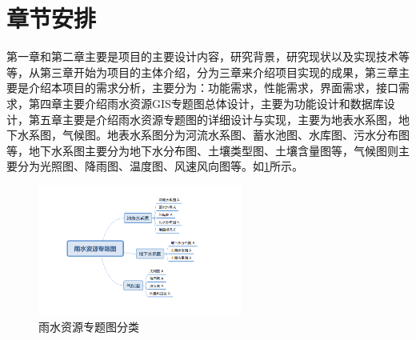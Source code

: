 \section{章节安排}
第一章和第二章主要是项目的主要设计内容，研究背景，研究现状以及实现技术等等，从第三章开始为项目的主体介绍，分为三章来介绍项目实现的成果，第三章主要是介绍本项目的需求分析，主要分为：功能需求，性能需求，界面需求，接口需求，第四章主要介绍雨水资源GIS专题图总体设计，主要为功能设计和数据库设计，第五章主要是介绍雨水资源专题图的详细设计与实现，主要为地表水系图，地下水系图，气候图。地表水系图分为河流水系图、蓄水池图、水库图、污水分布图等，地下水系图主要分为地下水分布图、土壤类型图、土壤含量图等，气候图则主要分为光照图、降雨图、温度图、风速风向图等。如\ref{fig:dirforest}所示。
\begin{figure}[!htb]%
  \centering
  \includegraphics[width=0.60\textwidth]{figs/tree.png}
  \caption{雨水资源专题图分类}
  \label{fig:dirforest}
\end{figure}

%

%

%
%





